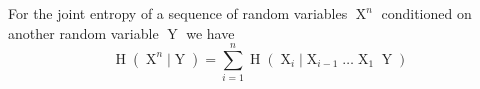 For the joint entropy of a sequence of random variables $\operatorname{X}^n$  conditioned on another random variable $\operatorname{Y}$ we have
$$\operatorname{H}(\operatorname{X}^n | \operatorname{Y}) = \sum\limits_{i =1}^n \operatorname{H}(\operatorname{X}_i | \operatorname{X}_{i-1} \dots \operatorname{X}_1 \operatorname{Y})$$ 
